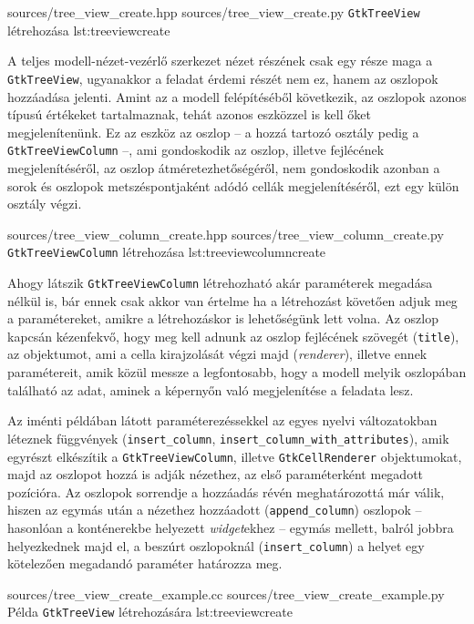 {sources/tree_view_create.hpp}
{sources/tree_view_create.py}
{\texttt{GtkTreeView} létrehozása}
{lst:treeviewcreate}

A teljes modell-nézet-vezérlő szerkezet nézet részének csak egy része maga a \texttt{GtkTreeView}, ugyanakkor a feladat érdemi részét nem ez, hanem az oszlopok hozzáadása jelenti. Amint az a modell felépítéséből következik, az oszlopok azonos típusú értékeket tartalmaznak, tehát azonos eszközzel is kell őket megjelenítenünk. Ez az eszköz az oszlop -- a hozzá tartozó osztály pedig a \texttt{GtkTreeViewColumn} --, ami gondoskodik az oszlop, illetve fejlécének megjelenítéséről, az oszlop átméretezhetőségéről, nem gondoskodik azonban a sorok és oszlopok metszéspontjaként adódó cellák megjelenítéséről, ezt egy külön osztály végzi.

{sources/tree_view_column_create.hpp}
{sources/tree_view_column_create.py}
{\texttt{GtkTreeViewColumn} létrehozása}
{lst:treeviewcolumncreate}

Ahogy látszik \texttt{GtkTreeViewColumn} létrehozható akár paraméterek megadása nélkül is, bár ennek csak akkor van értelme ha a létrehozást követően adjuk meg a paramétereket, amikre a létrehozáskor is lehetőségünk lett volna. Az oszlop kapcsán kézenfekvő, hogy meg kell adnunk az oszlop fejlécének szövegét (\texttt{title}), az objektumot, ami a cella kirajzolását végzi majd (\textit{renderer}), illetve ennek paramétereit, amik közül messze a legfontosabb, hogy a modell melyik oszlopában található az adat, aminek a képernyőn való megjelenítése a feladata lesz.

Az iménti példában látott paraméterezéssekkel az egyes nyelvi változatokban léteznek függvények (\texttt{insert\_column}, \texttt{insert\_column\_with\_attributes}), amik egyrészt elkészítik a \texttt{GtkTreeViewColumn}, illetve \texttt{GtkCellRenderer} objektumokat, majd az oszlopot hozzá is adják nézethez, az első paraméterként megadott pozícióra. Az oszlopok sorrendje a hozzáadás révén meghatározottá már válik, hiszen az egymás után a nézethez hozzáadott (\texttt{append\_column}) oszlopok -- hasonlóan a konténerekbe helyezett \textit{widget}ekhez -- egymás mellett, balról jobbra helyezkednek majd el, a beszúrt oszlopoknál (\texttt{insert\_column}) a helyet egy kötelezően megadandó paraméter határozza meg.

{sources/tree_view_create_example.cc}
{sources/tree_view_create_example.py}
{Példa \texttt{GtkTreeView} létrehozására}
{lst:treeviewcreate}

